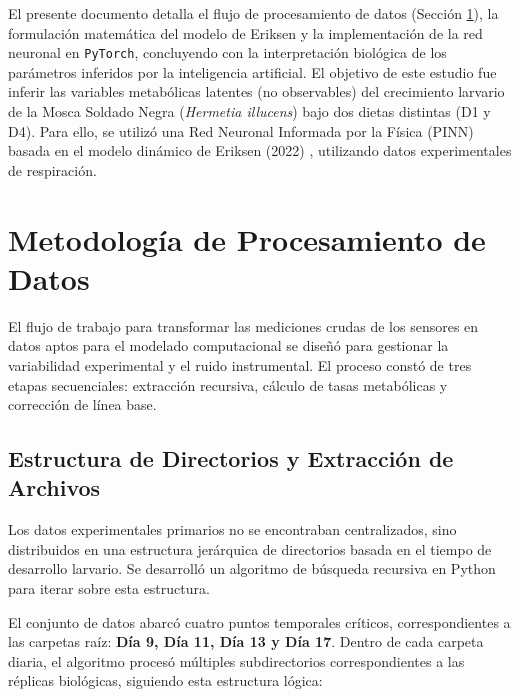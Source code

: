 \vspace{1em}
\noindent El presente documento detalla el flujo de procesamiento de datos (Sección \ref{sec:preprocessing}), la formulación matemática del modelo de Eriksen y la implementación de la red neuronal en \texttt{PyTorch}, concluyendo con la interpretación biológica de los parámetros inferidos por la inteligencia artificial.
El objetivo de este estudio fue inferir las variables metabólicas latentes (no observables) del crecimiento larvario de la Mosca Soldado Negra (\textit{Hermetia illucens}) bajo dos dietas distintas (D1 y D4). Para ello, se utilizó una Red Neuronal Informada por la Física (PINN) basada en el modelo dinámico de Eriksen (2022) \cite{eriksenDynamicModellingFeed2022}, utilizando datos experimentales de respiración.

\section{Metodología de Procesamiento de Datos}
\label{sec:preprocessing}

El flujo de trabajo para transformar las mediciones crudas de los sensores en datos aptos para el modelado computacional se diseñó para gestionar la variabilidad experimental y el ruido instrumental. El proceso constó de tres etapas secuenciales: extracción recursiva, cálculo de tasas metabólicas y corrección de línea base.

\subsection{Estructura de Directorios y Extracción de Archivos}
Los datos experimentales primarios no se encontraban centralizados, sino distribuidos en una estructura jerárquica de directorios basada en el tiempo de desarrollo larvario. Se desarrolló un algoritmo de búsqueda recursiva en Python para iterar sobre esta estructura.

El conjunto de datos abarcó cuatro puntos temporales críticos, correspondientes a las carpetas raíz: \textbf{Día 9, Día 11, Día 13 y Día 17}. Dentro de cada carpeta diaria, el algoritmo procesó múltiples subdirectorios correspondientes a las réplicas biológicas, siguiendo esta estructura lógica:

